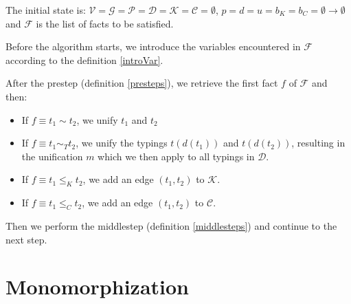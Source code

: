 \begin{defn}
    The initial state is: $\mathcal{V} = \mathcal{G} = \mathcal{P} = \mathcal{D} = \mathcal{K} = \mathcal{C} = \emptyset$, $p = d = u = b_K = b_C = \emptyset \to \emptyset$ and $\mathcal{F}$ is the list of facts to be satisfied.

    Before the algorithm starts, we introduce the variables encountered in $\mathcal{F}$ according to the definition \ref{introVar}.
\end{defn}

\begin{defn}
    After the prestep (definition \ref{presteps}), we retrieve the first fact $f$ of $\mathcal{F}$ and then:

    \begin{itemize}
        \item If $f \equiv t_1 \sim t_2$, we unify $t_1$ and $t_2$
        \item If $f \equiv t_1 \sim_T t_2$, we unify the typings $t (d (t_1))$ and $t (d (t_2))$, resulting in the unification $m$ which we then apply to all typings in $\mathcal{D}$.
        \item If $f \equiv t_1 \leq_K t_2$, we add an edge $(t_1, t_2)$ to $\mathcal{K}$.
        \item If $f \equiv t_1 \leq_C t_2$, we add an edge $(t_1, t_2)$ to $\mathcal{C}$.
    \end{itemize}

    Then we perform the middlestep (definition \ref{middlesteps}) and continue to the next step.
\end{defn}

\section{Monomorphization}

